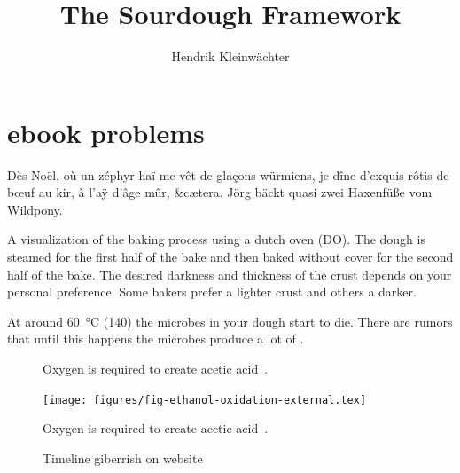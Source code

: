 \documentclass[paper=a4, twoside=false, fontsize=12pt, parskip=half,
                bibliography=totoc, listof=totoc]{scrbook}
\author{Hendrik Kleinwächter}
\title{The Sourdough Framework}
\begin{document}

\titlepage

{%
\hypersetup{hidelinks}
\ifdefined\HCode\else\tableofcontents\fi
}

\chapter{ebook problems}
Dès Noël, où un zéphyr haï me vêt de glaçons würmiens, je dîne d’exquis rôtis
de bœuf au kir, à l’aÿ d’âge mûr, \&cætera.
Jörg bäckt quasi zwei Haxenfüße vom Wildpony.

\begin{flowchart}[!htb]
\begin{center}
  
  \caption[Baking process with a dutch oven]{A visualization of the baking
      process using a dutch oven (DO). The dough is steamed for the first half
      of the bake and then baked without cover for the second half of the
      bake. The desired darkness and thickness of the crust depends on your
      personal preference. Some bakers prefer a lighter crust and others a
      darker.}%
  \label{fig:dutch-oven-process}
\end{center}
\end{flowchart}

At around  \qty{60}{\degreeCelsius} (\qty{140}{\degF}) the microbes in your
dough start to die.  There are rumors that until this happens the microbes
produce a lot of .

\begin{figure}[!htb]
\begin{center}
  
  \caption[Acetic acid creation]{Oxygen is required to create acetic
      acid~\cite{acetic+acid+production}.}%
  \label{fig:ethanol-oxidation}
\end{center}
\end{figure}

\begin{figure}[!htb]
  \begin{center}
    \texttt{[image: figures/fig-ethanol-oxidation-external.tex]}
    \caption[Acetic acid creation]{Oxygen is required to create acetic
        acid~\cite{acetic+acid+production}.}%
  \end{center}
\end{figure}

\begin{figure}[!htb]
\begin{center}
  
  \caption[Sourdough microbiology timeline]{Timeline giberrish on website}%
\end{center}
\end{figure}
\end{document}
